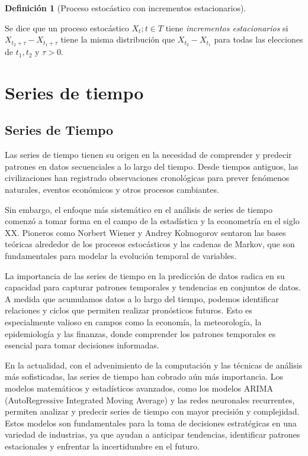 \documentclass[
  letterpaper,
  DIV=11,
  numbers=noendperiod]{scrreport}
\theoremstyle{plain}
\theoremstyle{definition}
\newtheorem{definition}{Definición}[chapter]
\theoremstyle{definition}
\theoremstyle{plain}
\theoremstyle{remark}
\begin{document}
\begin{definition}[Proceso estocástico con incrementos
estacionarios]\protect\hypertarget{def-incest}{}\label{def-incest}

Se dice que un proceso estocástico \({X_t; t\in T}\) tiene
\emph{incrementos estacionarios} si \(X_{t_2+\tau}-X_{t_1+\tau}\) tiene
la misma distribución que \(X_{t_2}-X_{t_1}\) para todas las elecciones
de \(t_1,t_2\) y \(\tau>0\).

\end{definition}

\part{Series de tiempo}

\chapter{Series de Tiempo}\label{series-de-tiempo-1}

Las series de tiempo tienen su origen en la necesidad de comprender y
predecir patrones en datos secuenciales a lo largo del tiempo. Desde
tiempos antiguos, las civilizaciones han registrado observaciones
cronológicas para prever fenómenos naturales, eventos económicos y otros
procesos cambiantes.

Sin embargo, el enfoque más sistemático en el análisis de series de
tiempo comenzó a tomar forma en el campo de la estadística y la
econometría en el siglo XX. Pioneros como Norbert Wiener y Andrey
Kolmogorov sentaron las bases teóricas alrededor de los procesos
estocásticos y las cadenas de Markov, que son fundamentales para modelar
la evolución temporal de variables.

La importancia de las series de tiempo en la predicción de datos radica
en su capacidad para capturar patrones temporales y tendencias en
conjuntos de datos. A medida que acumulamos datos a lo largo del tiempo,
podemos identificar relaciones y ciclos que permiten realizar
pronósticos futuros. Esto es especialmente valioso en campos como la
economía, la meteorología, la epidemiología y las finanzas, donde
comprender los patrones temporales es esencial para tomar decisiones
informadas.

En la actualidad, con el advenimiento de la computación y las técnicas
de análisis más sofisticadas, las series de tiempo han cobrado aún más
importancia. Los modelos matemáticos y estadísticos avanzados, como los
modelos ARIMA (AutoRegressive Integrated Moving Average) y las redes
neuronales recurrentes, permiten analizar y predecir series de tiempo
con mayor precisión y complejidad. Estos modelos son fundamentales para
la toma de decisiones estratégicas en una variedad de industrias, ya que
ayudan a anticipar tendencias, identificar patrones estacionales y
enfrentar la incertidumbre en el futuro.
\end{document}
